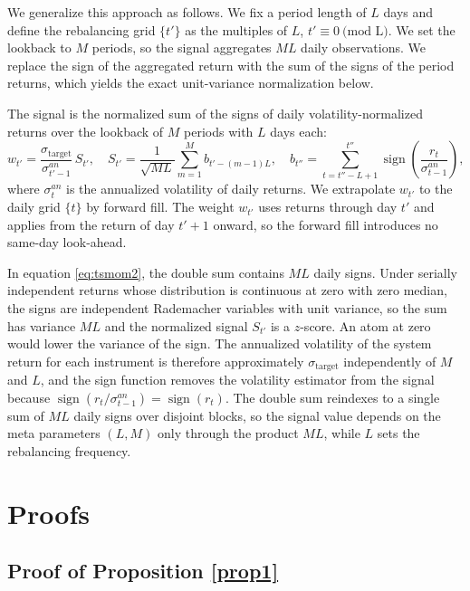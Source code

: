 \documentclass[hidelinks]{siamonline250211}
\DeclareMathOperator{\sgn}{sign}
\begin{document}
We generalize this approach as follows. We fix a period length of $L$ days and define the rebalancing grid $\{t'\}$ as the multiples of $L$, $t' \equiv 0 \ \text{(mod L)}$. We set the lookback to $M$ periods, so the signal aggregates $ML$ daily observations.  We replace the sign of the aggregated return with the sum of the signs of the period returns, which yields the exact unit-variance normalization below.

\begin{definition}[TSMOM] The signal is the normalized sum of the signs of daily volatility-normalized returns over the lookback of $M$ periods with $L$ days each:
	\begin{equation} \label{eq:tsmom2} 
		w_{t'} = \frac{\sigma_{\mathrm{target}}}{\sigma^{an}_{t'-1}}\, S_{t'} , \quad
		S_{t'}  = \frac{1}{\sqrt{ML}} \sum^{M}_{m=1} b_{t'-(m-1)L}, \quad b_{t''} = \sum^{t''}_{t=t''-L+1} \sgn\left(\frac{r_{t}}{\sigma^{an}_{t-1}}\right),
	\end{equation}
	where $\sigma^{an}_{t}$ is the annualized volatility of daily returns. We extrapolate $w_{t'}$ to the daily grid $\{t\}$ by forward fill. The weight $w_{t'}$ uses returns through day $t'$ and applies from the return of day $t'+1$ onward, so the forward fill introduces no same-day look-ahead.
\end{definition}

In equation \eqref{eq:tsmom2}, the double sum contains $ML$ daily signs. Under serially independent returns whose distribution is continuous at zero with zero median, the signs are independent Rademacher variables with unit variance, so the sum has variance $ML$ and the normalized signal $S_{t'}$ is a $z$-score. An atom at zero would lower the variance of the sign. The annualized volatility of the system return for each instrument is therefore approximately $\sigma_{\mathrm{target}}$ independently of $M$ and $L$, and the sign function removes the volatility estimator from the signal because $\sgn(r_{t}/\sigma^{an}_{t-1})=\sgn(r_{t})$. The double sum reindexes to a single sum of $ML$ daily signs over disjoint blocks, so the signal value depends on the meta parameters $(L, M)$ only through the product $ML$, while $L$ sets the rebalancing frequency.

\section{Proofs}\label{app:proofs}


\subsection{Proof of Proposition \ref{prop1}}\label{sec:prop1}
\end{document}

